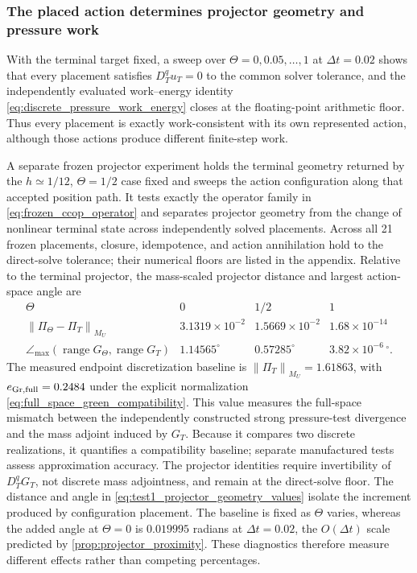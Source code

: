 \documentclass[11pt]{article}
\theoremstyle{plain}
\theoremstyle{definition}
\theoremstyle{remark}
\newcommand{\range}{\operatorname{range}}
\newcommand{\dt}{\Delta t}
\newcommand{\Th}{\Theta}
\newcommand{\norm}[2][]{\left\lVert #2\right\rVert_{#1}}
\begin{document}
\subsubsection{The placed action determines projector geometry and pressure work}

With the terminal target fixed, a sweep over
$\Th=0,0.05,\ldots,1$ at $\dt=0.02$ shows that every placement satisfies
$D_T^qu_T=0$ to the common solver tolerance, and the independently evaluated
work--energy identity \eqref{eq:discrete_pressure_work_energy} closes at the
floating-point arithmetic floor.  Thus every placement is exactly
work-consistent with its own represented action, although those actions
produce different finite-step work.

A separate frozen projector experiment holds the terminal geometry returned by the
$h\simeq1/12$, $\Th=1/2$ case fixed and sweeps the action configuration along
that accepted position path.  It tests exactly the operator family
in \eqref{eq:frozen_ccop_operator} and separates projector geometry from the
change of nonlinear terminal state across independently solved placements.  Across
all 21 frozen placements, closure, idempotence, and action annihilation hold
to the direct-solve tolerance; their numerical floors are listed in the
appendix.  Relative to the terminal projector, the
mass-scaled projector distance and largest action-space angle are
\begin{equation}
\begin{array}{c|ccc}
\Th & 0 & 1/2 & 1 \\ \hline
\norm[M_U]{\Pi_\Th-\Pi_T}
 & 3.1319\times10^{-2} & 1.5669\times10^{-2} & 1.68\times10^{-14}\\
\angle_{\max}(\range G_\Th,\range G_T)
 & 1.14565^\circ & 0.57285^\circ & 3.82\times10^{-6}\,{}^\circ.
\end{array}
\label{eq:test1_projector_geometry_values}
\end{equation}
The measured endpoint discretization baseline is
$\norm[M_U]{\Pi_T}=1.61863$, with
$e_{{\rm Gr},{\rm full}}=0.2484$ under the explicit normalization
\eqref{eq:full_space_green_compatibility}.
This value measures the full-space mismatch between the independently
constructed strong pressure-test divergence and the mass adjoint induced by
$G_T$.  Because it compares two discrete realizations, it quantifies a
compatibility baseline; separate manufactured tests assess approximation
accuracy.  The projector identities require
invertibility of $D_T^qG_T$, not discrete mass adjointness, and remain at the
direct-solve floor.
The distance and angle in \eqref{eq:test1_projector_geometry_values} isolate
the increment produced by configuration placement.  The baseline is fixed as $\Th$ varies,
whereas the added angle at $\Th=0$ is $0.019995$ radians at $\dt=0.02$, the
$O(\dt)$ scale predicted by \cref{prop:projector_proximity}.  These diagnostics
therefore measure different effects rather than competing percentages.
\end{document}

